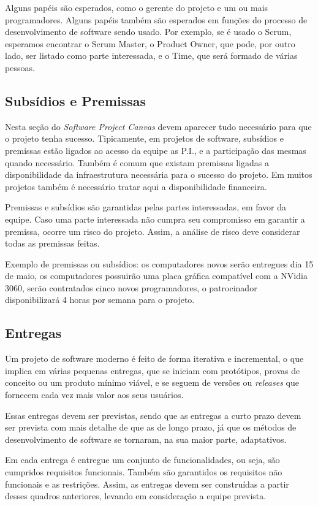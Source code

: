 \documentclass[a4]{report}
\begin{document}
Alguns papéis são esperados\citeauthor{finocchio:2013}, como o gerente do projeto e um ou mais programadores. Alguns papéis também são esperados em funções do processo de desenvolvimento de software sendo usado. Por exemplo, se é usado o Scrum, esperamos encontrar o Scrum Master, o Product Owner, que pode, por outro lado, ser listado como parte interessada, e o Time, que será formado de várias pessoas.
\subsection{Subsídios e Premissas}
Nesta seção do \textit{Software Project Canvas} devem aparecer tudo necessário para que o projeto tenha sucesso. Tipicamente, em projetos de software, subsídios e premissas estão ligados ao acesso da equipe as P.I., e a participação das mesmas quando necessário. Também é comum que existam premissas ligadas a disponibilidade da infraestrutura necessária para o sucesso do projeto. Em muitos projetos também é necessário tratar aqui a disponibilidade financeira.

Premissas e subsídios são garantidas pelas partes interessadas, em favor da equipe. Caso uma parte interessada não cumpra seu compromisso em garantir a premissa, ocorre um risco do projeto. Assim, a análise de risco deve considerar todas as premissas feitas.

Exemplo de premissas ou subsídios: os computadores novos serão entregues dia 15 de maio, os computadores possuirão uma placa gráfica compatível com a NVidia 3060, serão contratados cinco novos programadores, o patrocinador disponibilizará 4 horas por semana para o projeto.

\subsection{Entregas}

Um projeto de software moderno é feito de forma iterativa e incremental\citep{pressman:2019,essential:scrum}, o que implica em várias pequenas entregas, que se iniciam com protótipos, provas de conceito ou um produto mínimo viável, e se seguem de versões ou \textit{releases} que fornecem cada vez mais valor aos seus usuários.

Essas entregas devem ser previstas, sendo que as entregas a curto prazo devem ser prevista com mais detalhe de que as de longo prazo, já que os métodos de desenvolvimento de software se tornaram, na sua maior parte, adaptativos.

Em cada entrega é entregue um conjunto de funcionalidades, ou seja, são cumpridos requisitos funcionais. Também são garantidos os requisitos não funcionais e as restrições. Assim, as entregas devem ser construídas a partir desses quadros anteriores, levando em consideração a equipe prevista.
\end{document}
